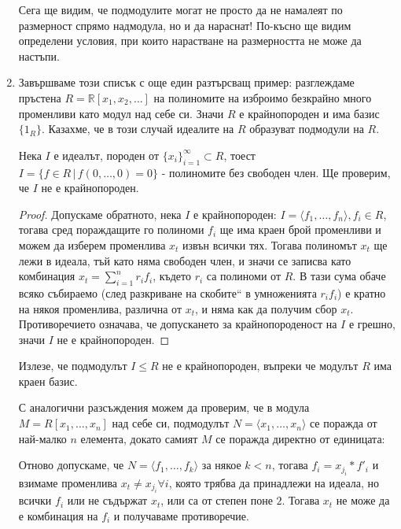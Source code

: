 \documentclass{article}
\newif\ifusemulticols
\theoremstyle{definition}
\theoremstyle{remark}
\theoremstyle{plain}
\theoremstyle{plain}
\newenvironment{mymulticols}
    { \ifusemulticols \begin{multicols}{2} \fi }
    { \ifusemulticols \end{multicols} \fi }
\begin{document}
\begin{mymulticols}
\begin{enumerate}
        Сега ще видим, че подмодулите могат не просто да не намалеят по размерност спрямо надмодула,
        но и да нараснат! По-късно ще видим определени условия, при които нарастване на размерността
        не може да настъпи.
    \item Завършваме този списък с още един разтърсващ пример: разглеждаме пръстена $R = \mathbb
        R[x_1, x_2, \dots]$ на полиномите на изброимо безкрайно много променливи като модул над себе
        си.
        Значи $R$ е крайнопороден и има базис $\{ 1_R \}$.
        Казахме, че в този случай идеалите на $R$ образуват подмодули на $R$.

        Нека $I$ е идеалът, породен от $\{x_i\}_{i=1}^\infty\subset R$, тоест $I=\{f\in R \, | \,
        f(0,\ldots,0) = 0\}$ - полиномите без свободен член.
        Ще проверим, че $I$ не е крайнопороден.
        \begin{proof}
            Допускаме обратното, нека $I$ е крайнопороден: $I=\langle
            f_{1},\dots,f_{n}\rangle,f_{i}\in R$, тогава сред пораждащите го полиноми $f_i$ ще има
            краен брой променливи и можем да изберем променлива $x_{t}$ извън всички тях.
            Тогава полиномът $x_{t}$ ще лежи в идеала, тъй като няма свободен член, и значи се
            записва като комбинация $x_{t}=\sum_{i=1}^{n}r_{i}f_{i}$, където $r_{i}$ са полиноми от
            $R$.
            В тази сума обаче всяко събираемо (след \quotedblbase разкриване на скобите`` в
            умноженията $r_{i}f_{i}$) е кратно на някоя променлива, различна от $x_{t}$, и няма как
            да получим сбор $x_{t}$.
            Противоречието означава, че допускането за крайнопороденост на $I$ е грешно, значи $I$
            не е крайнопороден.
        \end{proof}

        Излезе, че подмодулът $I \le R$ не е крайнопороден, въпреки че модулът $R$ има краен базис.

        С аналогични разсъждения можем да проверим, че в модула $M = R[x_1,\dots,x_n]$ над себе си,
        подмодулът $N = \langle x_1,\dots,x_n \rangle$ се поражда от най-малко $n$ елемента, докато
        самият $M$ се поражда директно от единицата:

        Отново допускаме, че $N = \langle f_1, \dots, f_k \rangle$ за някое $k < n$, тогава $f_i =
        x_{j_i}*f'_i$ и взимаме променлива $x_t \not= x_{j_i} \forall i$, която трябва да
        принадлежи на идеала, но всички $f_i$ или не съдържат $x_t$, или са от степен поне $2$.
        Тогава $x_t$ не може да е комбинация на $f_i$ и получаваме противоречие.


\end{enumerate}
\end{mymulticols}
\end{document}
